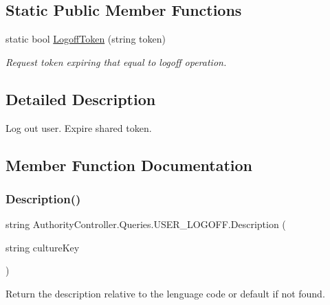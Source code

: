 \subsection*{Static Public Member Functions}
\begin{DoxyCompactItemize}
\item 
static bool \mbox{\hyperlink{class_authority_controller_1_1_queries_1_1_u_s_e_r___l_o_g_o_f_f_aee1aba51496e1412706f77c53650955a}{Logoff\+Token}} (string token)
\begin{DoxyCompactList}\small\item\em Request token expiring that equal to logoff operation. \end{DoxyCompactList}\end{DoxyCompactItemize}


\subsection{Detailed Description}
Log out user. Expire shared token. 



\subsection{Member Function Documentation}
\mbox{\label{class_authority_controller_1_1_queries_1_1_u_s_e_r___l_o_g_o_f_f_a2cb738d74699241341b691cc55b57e1d}} 
\subsubsection{\texorpdfstring{Description()}{Description()}}
{\footnotesize\ttfamily string Authority\+Controller.\+Queries.\+U\+S\+E\+R\+\_\+\+L\+O\+G\+O\+F\+F.\+Description (\begin{DoxyParamCaption}\item[{string}]{culture\+Key }\end{DoxyParamCaption})}



Return the description relative to the lenguage code or default if not found. 


